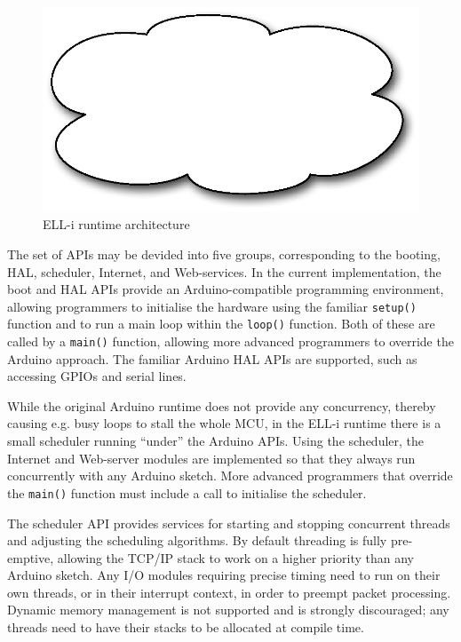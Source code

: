 \documentclass[final]{siamltex}
\begin{document}
\begin{figure}
\centering
\includegraphics[scale=.4]{figure-software.eps}
\caption{ELL-i runtime architecture}
\label{fig:software}
\end{figure}

The set of APIs may be devided into five groups, corresponding to the
booting, HAL, scheduler, Internet, and Web-services.  In the current
implementation, the boot and HAL APIs provide an Arduino-compatible
programming environment, allowing programmers to initialise the
hardware using the familiar \hbox{\tt setup()} function and to run a
main loop within the \hbox{\tt loop()} function.  Both of these are
called by a \hbox{\tt main()} function, allowing more advanced
programmers to override the Arduino approach.  The familiar Arduino
HAL APIs are supported, such as accessing GPIOs and serial lines.

While the original Arduino runtime does not provide any concurrency,
thereby causing e.g. busy loops to stall the whole MCU, in the ELL-i
runtime there is a small scheduler running ``under'' the Arduino
APIs.  Using the scheduler, the Internet and Web-server modules are
implemented so that they always run concurrently with any Arduino
sketch.  More advanced programmers that override the \hbox{\tt main()}
function must include a call to initialise the scheduler.

The scheduler API provides services for starting and stopping concurrent
threads and adjusting the scheduling algorithms.  By default threading
is fully pre-emptive, allowing the TCP/IP stack to work on a higher
priority than any Arduino sketch.  Any I/O modules requiring precise
timing need to run on their own threads, or in their interrupt
context, in order to preempt packet processing.  Dynamic memory
management is not supported and is strongly discouraged; any threads
need to have their stacks to be allocated at compile time.
\end{document}
